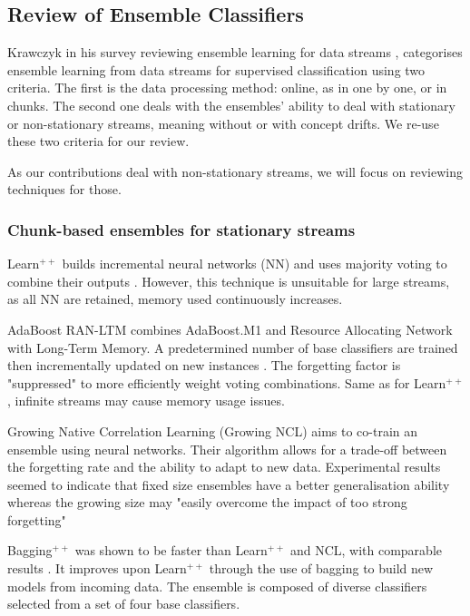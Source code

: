 \subsection{Review of Ensemble Classifiers \label{section:ensemble_review}}
Krawczyk in his survey reviewing ensemble learning for data streams \cite{KRAWCZYK2017132}, categorises ensemble learning from data streams for supervised classification using two criteria. The first is the data processing method: online, as in one by one, or in chunks. The second one deals with the ensembles' ability to deal with stationary or non-stationary streams, meaning without or with concept drifts. We re-use these two criteria for our review.

As our contributions deal with non-stationary streams, we will focus on reviewing techniques for those.

\subsubsection{Chunk-based ensembles for stationary streams}

Learn$^{++}$ builds incremental neural networks (NN) and uses majority voting to combine their outputs \cite{polikar2001learn++, KRAWCZYK2017132}. However, this technique is unsuitable for large streams, as all NN are retained, memory used continuously increases.

AdaBoost RAN-LTM combines AdaBoost.M1 and Resource Allocating Network with Long-Term Memory. A predetermined number of base classifiers are trained then incrementally updated on new instances \cite{kidera2006incremental, KRAWCZYK2017132}. The forgetting factor is "suppressed" to more efficiently weight voting combinations. Same as for Learn$^{++}$, infinite streams may cause memory usage issues.

Growing Native Correlation Learning (Growing NCL) aims to co-train an ensemble using neural networks. Their algorithm allows for a trade-off between the forgetting rate and the ability to adapt to new data. Experimental results seemed to indicate that fixed size ensembles have a better generalisation ability whereas the growing size may "easily overcome the impact of too strong forgetting" \cite{minku2009negative, KRAWCZYK2017132}

Bagging$^{++}$ was shown to be faster than Learn$^{++}$ and NCL, with comparable results \cite{zhao2010incremental, KRAWCZYK2017132}. It improves upon Learn$^{++}$ through the use of bagging to build new models from incoming data. The ensemble is composed of diverse classifiers selected from a set of four base classifiers.

